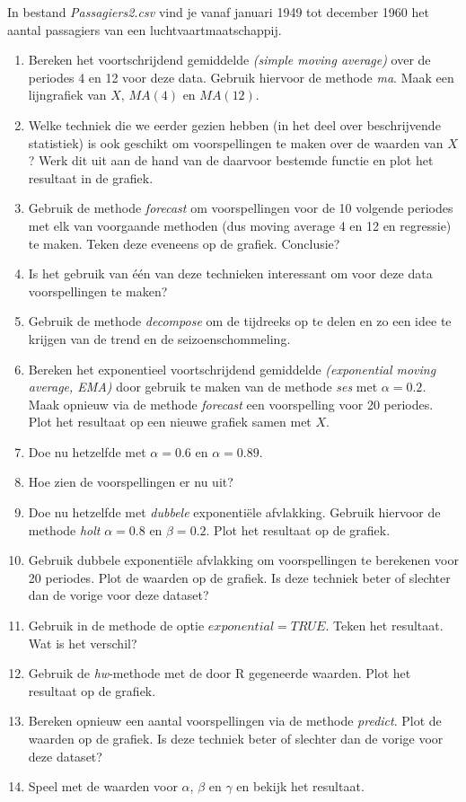 \begin{exercise}
In bestand \emph{Passagiers2.csv} vind je vanaf januari 1949 tot december 1960 het aantal passagiers van een luchtvaartmaatschappij. 
\begin{enumerate}
  \item Bereken het voortschrijdend gemiddelde \emph{(simple moving average)} over de periodes 4 en 12 voor deze data. Gebruik hiervoor de methode \emph{ma}. Maak een lijngrafiek van $X$, $MA(4)$ en $MA(12)$.
  \item Welke techniek die we eerder gezien hebben (in het deel over beschrijvende statistiek) is ook geschikt om voorspellingen te maken over de waarden van $X$? Werk dit uit aan de hand van de daarvoor bestemde functie en plot het resultaat in de grafiek.
  \item Gebruik de methode \emph{forecast} om voorspellingen voor de 10 volgende periodes met elk van voorgaande methoden (dus moving average 4 en 12 en regressie) te maken. Teken deze eveneens op de grafiek. Conclusie?
  \item Is het gebruik van één van deze technieken interessant om voor deze data voorspellingen te maken? 
  \item Gebruik de methode \emph{decompose} om de tijdreeks op te delen en zo een idee te krijgen van de trend en de seizoenschommeling.
  \item Bereken het exponentieel voortschrijdend gemiddelde \emph{(exponential moving average, EMA)} door gebruik te maken van de methode \emph{ses} met $\alpha=0.2$. Maak opnieuw via de methode \emph{forecast} een voorspelling voor 20 periodes. Plot het resultaat op een nieuwe grafiek samen met $X$.
  \item Doe nu hetzelfde met $\alpha=0.6$ en $\alpha=0.89$. 
  \item Hoe zien de voorspellingen er nu uit?
  \item Doe nu hetzelfde met \emph{dubbele} exponentiële afvlakking. Gebruik hiervoor de methode \emph{holt}  $\alpha =  0.8$ en $\beta = 0.2$. Plot het resultaat op de grafiek.
  \item Gebruik dubbele exponentiële afvlakking om voorspellingen te berekenen voor 20 periodes. Plot de waarden op de grafiek. Is deze techniek beter of slechter dan de vorige voor deze dataset?
  \item Gebruik in de methode de optie $exponential=TRUE$. Teken het resultaat.  Wat is het verschil?
  \item Gebruik de \emph{hw}-methode met de door R gegeneerde waarden. Plot het resultaat op de grafiek.
  \item Bereken opnieuw een aantal voorspellingen via de methode \emph{predict}. Plot de waarden op de grafiek. Is deze techniek beter of slechter dan de vorige voor deze dataset?
  \item Speel met de waarden voor $\alpha$, $\beta$ en $\gamma$ en bekijk het resultaat.
\end{enumerate}

\end{exercise}
